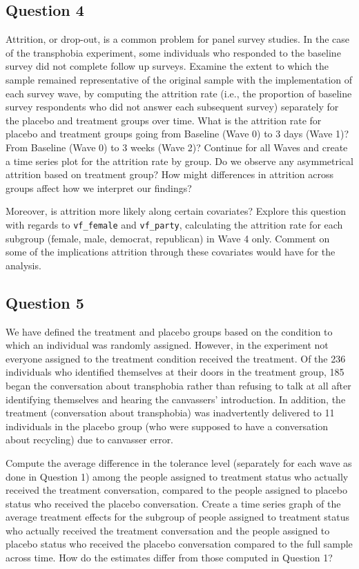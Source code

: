 \documentclass[]{article}
\begin{document}
\subsection{Question 4}\label{question-4}

Attrition, or drop-out, is a common problem for panel survey studies. In
the case of the transphobia experiment, some individuals who responded
to the baseline survey did not complete follow up surveys. Examine the
extent to which the sample remained representative of the original
sample with the implementation of each survey wave, by computing the
attrition rate (i.e., the proportion of baseline survey respondents who
did not answer each subsequent survey) separately for the placebo and
treatment groups over time. What is the attrition rate for placebo and
treatment groups going from Baseline (Wave 0) to 3 days (Wave 1)? From
Baseline (Wave 0) to 3 weeks (Wave 2)? Continue for all Waves and create
a time series plot for the attrition rate by group. Do we observe any
asymmetrical attrition based on treatment group? How might differences
in attrition across groups affect how we interpret our findings?

Moreover, is attrition more likely along certain covariates? Explore
this question with regards to \texttt{vf\_female} and
\texttt{vf\_party}, calculating the attrition rate for each subgroup
(female, male, democrat, republican) in Wave 4 only. Comment on some of
the implications attrition through these covariates would have for the
analysis.

\subsection{Question 5}\label{question-5}

We have defined the treatment and placebo groups based on the condition
to which an individual was randomly assigned. However, in the experiment
not everyone assigned to the treatment condition received the treatment.
Of the 236 individuals who identified themselves at their doors in the
treatment group, 185 began the conversation about transphobia rather
than refusing to talk at all after identifying themselves and hearing
the canvassers' introduction. In addition, the treatment (conversation
about transphobia) was inadvertently delivered to 11 individuals in the
placebo group (who were supposed to have a conversation about recycling)
due to canvasser error.

Compute the average difference in the tolerance level (separately for
each wave as done in Question 1) among the people assigned to treatment
status who actually received the treatment conversation, compared to the
people assigned to placebo status who received the placebo conversation.
Create a time series graph of the average treatment effects for the
subgroup of people assigned to treatment status who actually received
the treatment conversation and the people assigned to placebo status who
received the placebo conversation compared to the full sample across
time. How do the estimates differ from those computed in Question 1?
\end{document}
